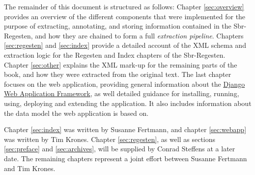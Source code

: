 The remainder of this document is structured as follows: Chapter
\ref{sec:overview} provides an overview of the different components
that were implemented for the purpose of extracting, annotating, and
storing information contained in the Sbr-Regesten, and how they are
chained to form a full \emph{extraction pipeline}. Chapters
\ref{sec:regesten} and \ref{sec:index} provide a detailed account of
the XML schema and extraction logic for the Regesten and Index
chapters of the Sbr-Regesten. Chapter \ref{sec:other} explains the XML
mark-up for the remaining parts of the book, and how they were
extracted from the original text. The last chapter focuses on the web
application, providing general information about the
\href{https://www.djangoproject.com/}{Django Web Application
  Framework}, as well detailed guidance for installing, running,
using, deploying and extending the application. It also includes
information about the data model the web application is based on.

Chapter \ref{sec:index} was written by Susanne Fertmann, and chapter
\ref{sec:webapp} was written by Tim Krones. Chapter
\ref{sec:regesten}, as well as sections \ref{sec:preface} and
\ref{sec:archives}, will be supplied by Conrad Steffens at a later
date. The remaining chapters represent a joint effort between Susanne
Fertmann and Tim Krones.
